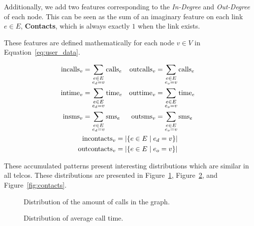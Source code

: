 Additionally, we add two features corresponding to the \emph{In-Degree} and \emph{Out-Degree} of each node. This can be seen as the sum of an imaginary feature on each link $e \in E$, \textbf{Contacts}, which is always exactly $1$ when the link exists.

These features are defined mathematically for each node $v \in V$ in Equation~\ref{eq:user_data}.

\begin{equation}
\begin{gathered}
\begin{aligned}
\operatorname{incalls}_v &= \sum_{\substack{e \in E \\ e_d = v}} \operatorname{calls}_e &
\operatorname{outcalls}_v &= \sum_{\substack{e \in E \\ e_o = v}} \operatorname{calls}_e \\
\operatorname{intime}_v &= \sum_{\substack{e \in E \\ e_d = v}} \operatorname{time}_e &
\operatorname{outtime}_v &= \sum_{\substack{e \in E \\ e_o = v}} \operatorname{time}_e \\
\operatorname{insms}_v &= \sum_{\substack{e \in E \\ e_d = v}} \operatorname{sms}_e &
\operatorname{outsms}_v &= \sum_{\substack{e \in E \\ e_o = v}} \operatorname{sms}_e \\
\end{aligned} \\
\begin{aligned}
\operatorname{incontacts}_v &= \left| \left\{ e \in E \mid e_d = v \right\} \right| \\
\operatorname{outcontacts}_v &= \left| \left\{ e \in E \mid e_o = v \right\} \right|
\end{aligned}
\end{gathered}
\label{eq:user_data}
\end{equation}

These accumulated patterns present interesting distributions which are similar in all telcos. These distributions are presented in Figure~\ref{fig:callsms}, Figure~\ref{fig:time}, and Figure~\ref{fig:contacts}.

\begin{figure}
\caption{Distribution of the amount of calls in the graph.}
\label{fig:callsms}
\end{figure}

\begin{figure}
\caption{Distribution of average call time.}
\label{fig:time}
\end{figure}

